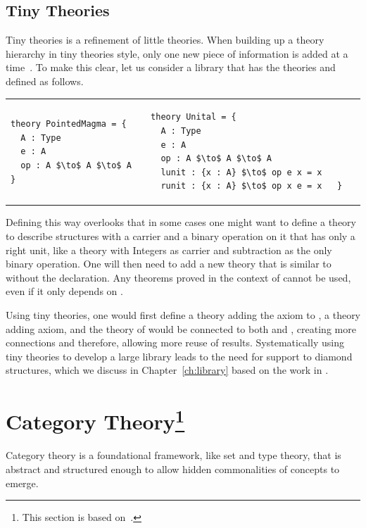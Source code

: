 \subsection{Tiny Theories}
\label{sec:background:tinytheories}
Tiny theories is a refinement of little theories. When building up a theory hierarchy in tiny theories style, only one new piece of information is added at a time~\cite{mathscheme2011experiments}. To make this clear, let us consider a library that has the theories  and  defined as follows. \\
\begin{tabular}{p{6cm} p{7cm}}
\begin{lstlisting}[mathescape, basicstyle=\footnotesize]
theory PointedMagma = { 
  A : Type 
  e : A 
  op : A $\to$ A $\to$ A }
\end{lstlisting}
&
\begin{lstlisting}[mathescape, basicstyle=\footnotesize]
theory Unital = {
  A : Type 
  e : A 
  op : A $\to$ A $\to$ A 
  lunit : {x : A} $\to$ op e x = x
  runit : {x : A} $\to$ op x e = x   }   
\end{lstlisting}
\end{tabular}

Defining  this way overlooks that in some cases one might want to define a theory to describe structures with a carrier and a binary operation on it that has only a right unit, like a theory with Integers as carrier and subtraction as the only binary operation. 
One will then need to add a new theory that is similar to  without the  declaration. Any theorems proved in the context of  cannot be used, even if it only depends on . 

Using tiny theories, one would first define a  theory adding the  axiom to , a  theory adding  axiom, and the theory of  would be connected to both  and , creating more connections and therefore, allowing more reuse of results. Systematically using tiny theories to develop a large library leads to the need for support to diamond structures, which we discuss in Chapter~\ref{ch:library} based on the work in \cite{carette2018building}.  

\section[Category Theory]{Category Theory\footnote{This section is based on~\cite{pierce1990taste}.}}
\label{sec:categoryTh}
Category theory is a foundational framework, like set and type theory, that is abstract and structured enough to allow hidden commonalities of concepts to emerge. 

